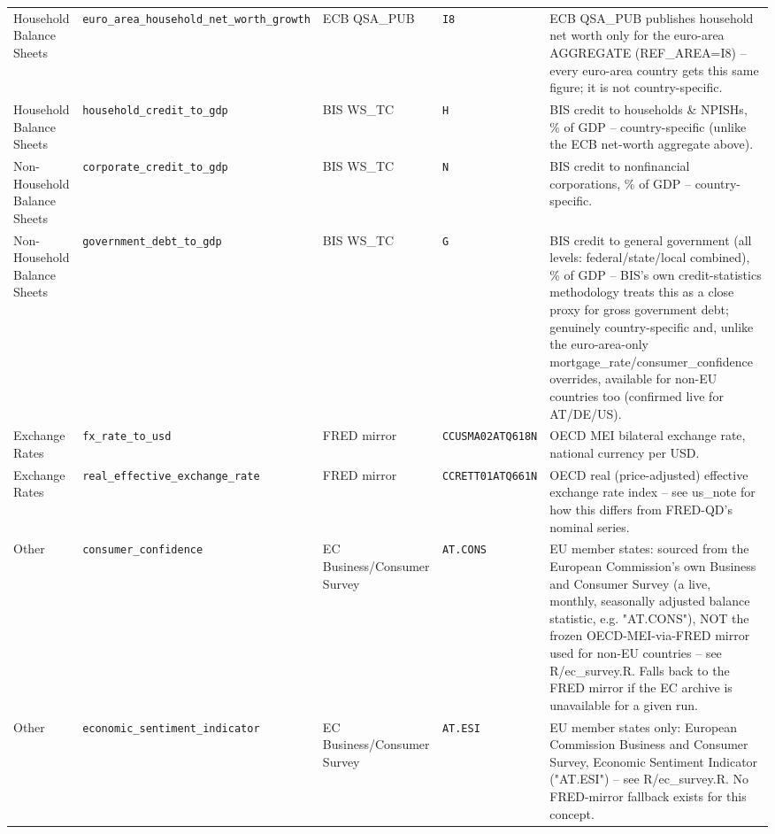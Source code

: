 \documentclass[11pt]{article}
\begin{document}
\begin{landscape}
\begin{longtable}{L{3cm} L{4cm} L{2.6cm} L{3.2cm} L{7.5cm}}
Household Balance Sheets & \texttt{euro\_\allowbreak{}area\_\allowbreak{}household\_\allowbreak{}net\_\allowbreak{}worth\_\allowbreak{}growth} & ECB QSA\_PUB & \texttt{I8} & ECB QSA\_PUB publishes household net worth only for the euro-area AGGREGATE (REF\_AREA=I8) -- every euro-area country gets this same figure; it is not country-specific. \\
Household Balance Sheets & \texttt{household\_\allowbreak{}credit\_\allowbreak{}to\_\allowbreak{}gdp} & BIS WS\_TC & \texttt{H} & BIS credit to households \& NPISHs, \% of GDP -- country-specific (unlike the ECB net-worth aggregate above). \\
Non-Household Balance Sheets & \texttt{corporate\_\allowbreak{}credit\_\allowbreak{}to\_\allowbreak{}gdp} & BIS WS\_TC & \texttt{N} & BIS credit to nonfinancial corporations, \% of GDP -- country-specific. \\
Non-Household Balance Sheets & \texttt{government\_\allowbreak{}debt\_\allowbreak{}to\_\allowbreak{}gdp} & BIS WS\_TC & \texttt{G} & BIS credit to general government (all levels: federal/state/local combined), \% of GDP -- BIS's own credit-statistics methodology treats this as a close proxy for gross government debt; genuinely country-specific and, unlike the euro-area-only mortgage\_rate/consumer\_confidence overrides, available for non-EU countries too (confirmed live for AT/DE/US). \\
Exchange Rates & \texttt{fx\_\allowbreak{}rate\_\allowbreak{}to\_\allowbreak{}usd} & FRED mirror & \texttt{CCUSMA02ATQ618N} & OECD MEI bilateral exchange rate, national currency per USD. \\
Exchange Rates & \texttt{real\_\allowbreak{}effective\_\allowbreak{}exchange\_\allowbreak{}rate} & FRED mirror & \texttt{CCRETT01ATQ661N} & OECD real (price-adjusted) effective exchange rate index -- see us\_note for how this differs from FRED-QD's nominal series. \\
Other & \texttt{consumer\_\allowbreak{}confidence} & EC Business/Consumer Survey & \texttt{AT.\allowbreak{}CONS} & EU member states: sourced from the European Commission's own Business and Consumer Survey (a live, monthly, seasonally adjusted balance statistic, e.g. "AT.CONS"), NOT the frozen OECD-MEI-via-FRED mirror used for non-EU countries -- see R/ec\_survey.R. Falls back to the FRED mirror if the EC archive is unavailable for a given run. \\
Other & \texttt{economic\_\allowbreak{}sentiment\_\allowbreak{}indicator} & EC Business/Consumer Survey & \texttt{AT.\allowbreak{}ESI} & EU member states only: European Commission Business and Consumer Survey, Economic Sentiment Indicator ("AT.ESI") -- see R/ec\_survey.R. No FRED-mirror fallback exists for this concept. \\

\end{longtable}
\end{landscape}
\end{document}
